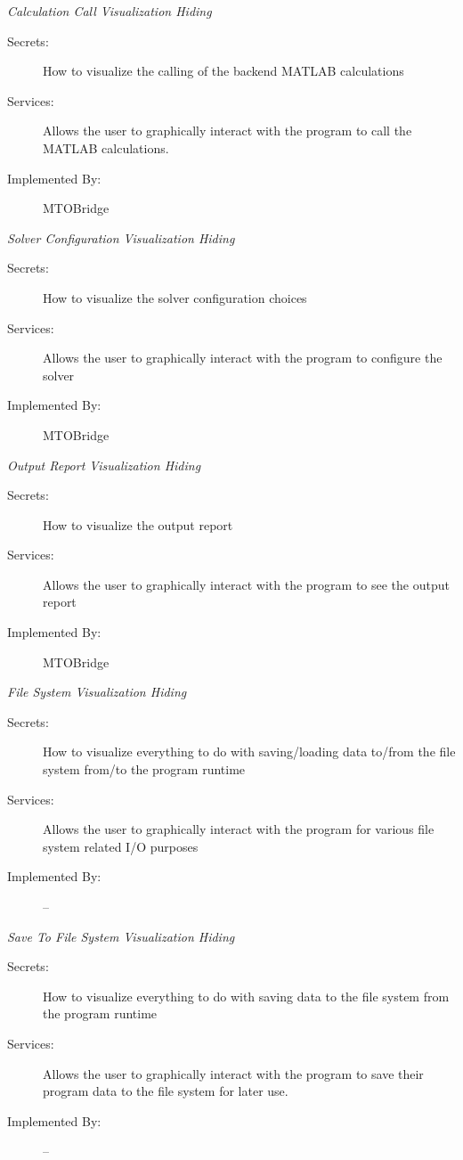 \documentclass[12pt, titlepage]{article}
\begin{document}
     \hypertarget{CCVH}{\emph{{\large Calculation Call Visualization Hiding}}}
    \begin{description}
        \item[Secrets:]How to visualize the calling of the backend MATLAB calculations
        \item[Services:]Allows the user to graphically interact with the program to call the MATLAB calculations.
        \item[Implemented By:] MTOBridge\\
    \end{description}
     \hypertarget{SCVH}{\emph{{\large Solver Configuration Visualization Hiding}}}
    \begin{description}
        \item[Secrets:]How to visualize the solver configuration choices
        \item[Services:]Allows the user to graphically interact with the program to configure the solver
        \item[Implemented By:] MTOBridge\\
    \end{description}
     \hypertarget{ORVH}{\emph{{\large Output Report Visualization Hiding}}}
    \begin{description}
        \item[Secrets:]How to visualize the output report
        \item[Services:]Allows the user to graphically interact with the program to see the output report
        \item[Implemented By:] MTOBridge\\
    \end{description}
     \hypertarget{FSVH}{\emph{{\large File System Visualization Hiding}}}
    \begin{description}
        \item[Secrets:]How to visualize everything to do with saving/loading data to/from the file system from/to the program runtime
        \item[Services:]Allows the user to graphically interact with the program for various file system related I/O purposes
        \item[Implemented By:] --\\
    \end{description}
     \hypertarget{STFSVH}{\emph{{\large Save To File System Visualization Hiding}}}
    \begin{description}
        \item[Secrets:]How to visualize everything to do with saving data to the file system from the program runtime
        \item[Services:]Allows the user to graphically interact with the program to save their program data to the file system for later use.
        \item[Implemented By:] --\\
    \end{description}
\end{document}
